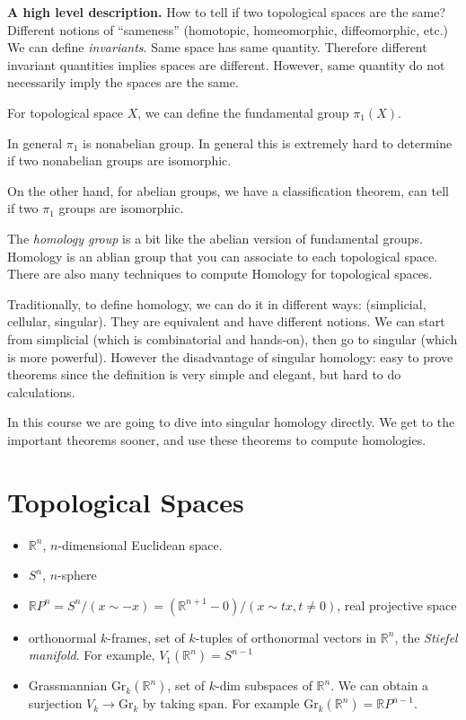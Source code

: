
\textbf{A high level description.} How to tell if two topological spaces are the same? Different notions of ``sameness'' (homotopic, homeomorphic, diffeomorphic, etc.) We can define \textit{invariants}. Same space has same quantity. Therefore different invariant quantities implies spaces are different. However, same quantity do not necessarily imply the spaces are the same.

\begin{example}
	For topological space $X$, we can define the fundamental group $\pi_1(X)$.

	In general $\pi_1$ is nonabelian group. In general this is extremely hard to determine if two nonabelian groups are isomorphic.

	On the other hand, for abelian groups, we have a classification theorem, can tell if two $\pi_1 $ groups are isomorphic.
\end{example}

The \textit{homology group} is a bit like the abelian version of fundamental groups. Homology is an ablian group that you can associate to each topological space. There are also many techniques to compute Homology for topological spaces.

Traditionally, to define homology, we can do it in different ways: (simplicial, cellular, singular). They are equivalent and have different notions. We can start from simplicial (which is combinatorial and hands-on), then go to singular (which is more powerful). However the disadvantage of singular homology: easy to prove theorems since the definition is very simple and elegant, but hard to do calculations.

In this course we are going to dive into singular homology directly. We get to the important theorems sooner, and use these theorems to compute homologies.

\section{Topological Spaces}

\begin{itemize}
	\item $\mathbb{R}^n$, $n$-dimensional Euclidean space.
	\item $S^n$, $n$-sphere
	\item $\mathbb{R}P^n = S^n / (x \sim - x) = (\mathbb{R}^{n + 1} - 0) / (x \sim  t x, t \neq 0)$, real projective space
	\item orthonormal $k$-frames, set of $k$-tuples of orthonormal vectors in $\mathbb{R}^n$, the \textit{Stiefel manifold}. For example, $V_1(\mathbb{R}^n) = S^{n-1}$
	\item Grassmannian $\text{Gr}_k(\mathbb{R}^n)$, set of $k$-dim subspaces of $\mathbb{R}^n$. We can obtain a surjection $V_k \to \text{Gr}_k$ by taking span. For example $\text{Gr}_k(\mathbb{R}^n) = \mathbb{R} P ^{n - 1}$.
\end{itemize}

